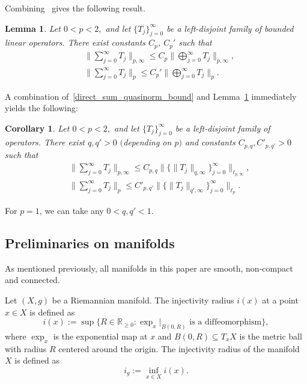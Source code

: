 \documentclass[pdftex]{sigma}
\numberwithin{equation}{section}
\newtheorem{Corollary}[Theorem]{Corollary}
\newtheorem{Lemma}[Theorem]{Lemma}
\begin{document}
Combining~\cite[Proposition 2.7 and Lemma 2.9]{LevitinaSukochev2020} gives the following result.
\begin{Lemma}\label{disjointification}
 Let $0<p<2,$ and let $\big\{T_j\big\}_{j=0}^\infty$ be a left-disjoint family of bounded linear operators. There exist constants $C_p$, $C_p'$ such that
 \begin{align*}
& \Bigg\|\sum_{j=0}^\infty T_j\Bigg\|_{p,\infty}\leq C_p\Bigg\|\bigoplus_{j=0}^\infty T_j\Bigg\|_{p,\infty},\\
& \Bigg\|\sum_{j=0}^\infty T_j\Bigg\|_{p}\leq C_p'\Bigg\|\bigoplus_{j=0}^\infty T_j\Bigg\|_{p}.
 \end{align*}
\end{Lemma}

A combination of~\eqref{direct_sum_quasinorm_bound} and Lemma~\ref{disjointification} immediately yields the following:
\begin{Corollary}\label{disjointification_corollary}
 Let $0<p<2,$ and let $\big\{T_j\big\}_{j=0}^\infty$ be a left-disjoint family of operators. There exist $q, q'>0$ $($depending on $p)$ and constants $C_{p,q}, C'_{p,q'}>0$ such that
 \begin{align*}
& \Bigg\|\sum_{j=0}^\infty T_j\Bigg\|_{p,\infty}\leq C_{p,q}\big\|\{\|T_j\|_{q,\infty}\}_{j=0}^\infty\big\|_{\ell_{p,\infty}},\\
& \Bigg\|\sum_{j=0}^\infty T_j\Bigg\|_{p}\leq C'_{p,q'}\big\|\{\|T_j\|_{q',\infty}\}_{j=0}^\infty\big\|_{\ell_{p}}.
 \end{align*}
\end{Corollary}

\begin{Remark}
 For $p=1$, we can take any $0<q,q'<1$.
\end{Remark}

\subsection{Preliminaries on manifolds}
\label{S: Manifolds}
As mentioned previously, all manifolds in this paper
are smooth, non-compact and connected.

\begin{Definition}
Let $(X,g)$ be a Riemannian manifold. The injectivity radius $i(x)$ at a point $x \in X$ is defined as
\[
i(x):= \sup \{ R \in \mathbb{R}_{\geq 0} \colon \exp_x|_{B(0,R)} \text{ is a diffeomorphism}\},
\]
where $\exp_x$ is the exponential map at $x$ and $B(0,R) \subseteq T_xX$ is the metric ball with radius $R$ centered around the origin. The injectivity radius of the manifold $X$ is defined as \[i_g := \inf_{x \in X} i(x).\]
\end{Definition}
\end{document}
